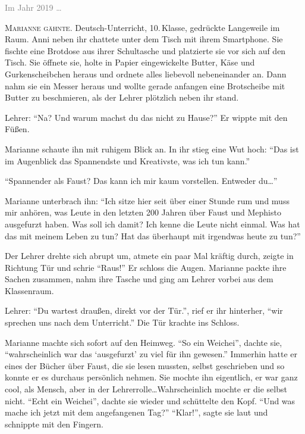 \label{cha:2019_marianne}

\textcolor{gray}{Im Jahr 2019 \dots} %

\textsc{Marianne gähnte}. Deutsch-Unterricht, 10.\,Klasse, gedrückte Langeweile im Raum.
Anni neben ihr chattete unter dem Tisch mit ihrem Smartphone.
Sie fischte eine Brotdose aus ihrer Schultasche und platzierte sie vor sich auf den Tisch.
Sie öffnete sie, holte in Papier eingewickelte Butter, Käse und Gurkenscheibchen heraus und ordnete alles liebevoll nebeneinander an.
Dann nahm sie ein Messer heraus und wollte gerade anfangen eine Brotscheibe mit Butter zu beschmieren, als der Lehrer plötzlich neben ihr stand.

Lehrer: \enquote{Na? Und warum machst du das nicht zu Hause?} Er wippte mit den Füßen.

Marianne schaute ihn mit ruhigem Blick an.
In ihr stieg eine Wut hoch: \enquote{Das ist im Augenblick das Spannendste und Kreativste, was ich tun kann.}

\enquote{Spannender als Faust? Das kann ich mir kaum vorstellen.
Entweder du\dots}

Marianne unterbrach ihn: \enquote{Ich sitze hier seit über einer Stunde rum und muss mir anhören, was Leute in den letzten 200 Jahren über Faust und Mephisto ausgefurzt haben.
Was soll ich damit?
Ich kenne die Leute nicht einmal.
Was hat das mit meinem Leben zu tun?
Hat das überhaupt mit irgendwas heute zu tun?}

Der Lehrer drehte sich abrupt um, atmete ein paar Mal kräftig durch, zeigte in Richtung Tür und schrie \enquote{Raus!}
Er schloss die Augen.
Marianne packte ihre Sachen zusammen, nahm ihre Tasche und ging am Lehrer vorbei aus dem Klassenraum.

Lehrer: \enquote{Du wartest draußen, direkt vor der Tür.}, rief er ihr hinterher, \enquote{wir sprechen uns nach dem Unterricht.}
Die Tür krachte ins Schloss.

Marianne machte sich sofort auf den Heimweg.
\enquote{So ein Weichei}, dachte sie, \enquote{wahrscheinlich war das \enquote{ausgefurzt} zu viel für ihn gewesen.}
Immerhin hatte er eines der Bücher über Faust, die sie lesen mussten, selbst geschrieben und so konnte er es durchaus persönlich nehmen.
Sie mochte ihn eigentlich, er war ganz cool, als Mensch, aber in der Lehrerrolle\dots Wahrscheinlich mochte er die selbst nicht.
\enquote{Echt ein Weichei}, dachte sie wieder und schüttelte den Kopf.
\enquote{Und was mache ich jetzt mit dem angefangenen Tag?} \enquote{Klar!}, sagte sie laut und schnippte mit den Fingern.

